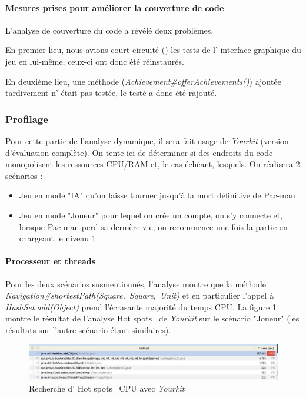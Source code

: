 \documentclass[12pt, openany]{report}
\begin{document}
\paragraph{Mesures prises pour améliorer la couverture de code}

L'analyse de couverture du code a révélé deux problèmes.

En premier lieu, nous avions \og court-circuité \fg() les tests de l' interface graphique du jeu en lui-même, ceux-ci ont donc été réinstaurés.

En deuxième lieu, une méthode (\mbox{\textit{Achievement\#offerAchievements()}}) ajoutée tardivement n' était pas testée, le testé a donc été rajouté.

\subsubsection{Profilage}
Pour cette partie de l'analyse dynamique, il sera fait usage de \textit{Yourkit} (version d'évaluation complète). On tente ici de déterminer si des endroits du code monopolisent les ressources CPU/RAM et, le cas échéant, lesquels.
On réalisera 2 scénarios :
\begin{itemize}
	\item Jeu en mode "IA" qu'on laisse tourner jusqu'à la mort définitive de Pac-man
	\item Jeu en mode "Joueur" pour lequel on crée un compte, on s'y connecte et, lorsque Pac-man perd sa dernière vie, on recommence une fois la partie en chargeant le niveau 1
\end{itemize}
\paragraph{Processeur et threads}
Pour les deux scénarios susmentionnés, l'analyse montre que la méthode \mbox{\textit{Navigation\#shortestPath(Square, Square, Unit)}} et en particulier l'appel à \mbox{\textit{HashSet.add(Object)}} prend l'écrasante majorité du temps CPU. La figure \ref{hotspot} montre le résultat de l'analyse \og Hot spots \fg \, de \textit{Yourkit} sur le scénario "Joueur" (les résultats sur l'autre scénario étant similaires).
\begin{figure}[h]
	\centering
	\includegraphics[width=16cm]{Images/hotspot.JPG}
	\caption{\label{hotspot} Recherche d' \og Hot spots \fg \, CPU avec \textit{Yourkit}}
\end{figure}
\end{document}
